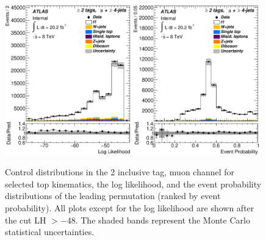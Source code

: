 \begin{figure}[!h]
\begin{center}
		\includegraphics[height=65mm]{chapters/whel/figures/control_Plots2/bTag_2incl_NoLHCut/LogLikelihood_mu}
        \includegraphics[height=65mm]{chapters/whel/figures/control_Plots2/bTag_2incl/EventProbability_mu}

	\caption{Control distributions in the 2 inclusive \bt tag, muon channel for selected top kinematics, the log likelihood, and the event probability distributions of the leading permutation (ranked by event probability). All plots except for the log likelihood are shown after the cut LH $> -48$. The shaded bands represent the Monte Carlo statistical uncertainties.}
	\label{fig:klfitter_control_plots_4}
	\end{center}    
	\end{figure}
